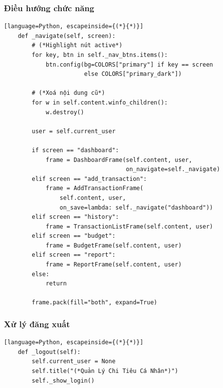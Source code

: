 \documentclass[12pt,letterpaper]{article}
\begin{document}
\subsubsection{Điều hướng chức năng}
\begin{lstlisting}[language=Python, escapeinside={(*}{*)}]
    def _navigate(self, screen):
        # (*Highlight nút active*)
        for key, btn in self._nav_btns.items():
            btn.config(bg=COLORS["primary"] if key == screen
                       else COLORS["primary_dark"])

        # (*Xoá nội dung cũ*)
        for w in self.content.winfo_children():
            w.destroy()

        user = self.current_user

        if screen == "dashboard":
            frame = DashboardFrame(self.content, user,
                                   on_navigate=self._navigate)
        elif screen == "add_transaction":
            frame = AddTransactionFrame(
                self.content, user,
                on_save=lambda: self._navigate("dashboard"))
        elif screen == "history":
            frame = TransactionListFrame(self.content, user)
        elif screen == "budget":
            frame = BudgetFrame(self.content, user)
        elif screen == "report":
            frame = ReportFrame(self.content, user)
        else:
            return

        frame.pack(fill="both", expand=True)
\end{lstlisting}
\subsubsection{Xử lý đăng xuất}
\noindent %
\begin{minipage}{\linewidth}
\begin{lstlisting}[language=Python, escapeinside={(*}{*)}]
    def _logout(self):
        self.current_user = None
        self.title("(*Quản Lý Chi Tiêu Cá Nhân*)")
        self._show_login()
\end{lstlisting}
\end{minipage}

\newpage
\end{document}
